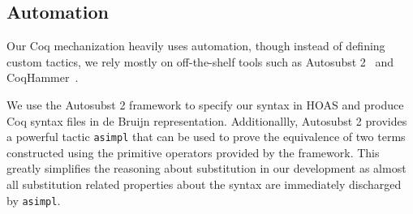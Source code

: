 \documentclass[acmsmall,screen=true,
\ifpublic review=false\else,review=true\fi
  ,anonymous=\ifanonymous true\else false\fi]{acmart}
\newcommand{\scw}[1]{}
\begin{document}


\subsection{Automation}
\label{sec:automation}
Our Coq mechanization heavily uses automation, though instead of
defining custom tactics, we rely mostly on off-the-shelf tools such as
Autosubst 2~\citep{autosubst2} and CoqHammer~\citep{czajka2018hammer}.

We use the Autosubst 2 framework to specify our syntax in HOAS and
produce Coq syntax files in de Bruijn representation. Additionallly,
Autosubst 2 provides a powerful tactic \texttt{asimpl} that
can be used to prove the equivalence of two terms constructed using
the primitive operators provided by the framework. This greatly
simplifies the reasoning about substitution in our development as
almost all substitution related properties about the syntax are
immediately discharged by \texttt{asimpl}.
\end{document}
